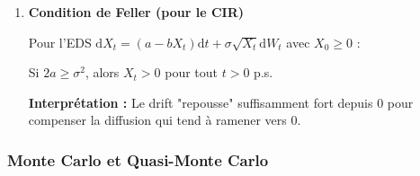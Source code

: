 \documentclass[12pt,a4paper]{article}
\theoremstyle{definition}
\theoremstyle{remark}
\newcommand{\E}{\mathbb{E}}
\newcommand{\dd}{\mathrm{d}}
\begin{document}
\begin{enumerate}
\[
\tilde{X}_{t_{k+1}} = \tilde{X}_{t_k} + b\Delta t + \sigma\Delta W_k + \frac{1}{2}\sigma\sigma'_x[(\Delta W_k)^2 - \Delta t]
\]

\textbf{Convergence forte :} $\E[\sup_{t \in [0,T]} |X_t - \tilde{X}_t^n|^2] = O(n^{-2})$ (ordre 1)

Nécessite que $\sigma$ soit $\mathcal{C}^1$ et lipschitzienne avec sa dérivée.

\item \textbf{Condition de Feller (pour le CIR)}

Pour l'EDS $\dd X_t = (a - bX_t)\dd t + \sigma\sqrt{X_t}\dd W_t$ avec $X_0 \geq 0$ :

Si $2a \geq \sigma^2$, alors $X_t > 0$ pour tout $t > 0$ p.s.

\textbf{Interprétation :} Le drift "repousse" suffisamment fort depuis $0$ pour compenser la diffusion qui tend à ramener vers $0$.
\end{enumerate}

\subsubsection{Monte Carlo et Quasi-Monte Carlo}
\end{document}
